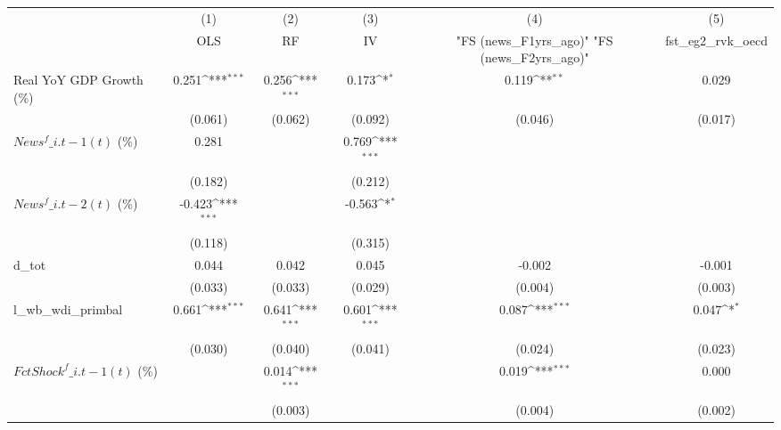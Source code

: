 {
\def\sym#1{\ifmmode^{#1}\else\(^{#1}\)\fi}
\begin{tabular}{l*{5}{c}}
\toprule
                    &\multicolumn{1}{c}{(1)}&\multicolumn{1}{c}{(2)}&\multicolumn{1}{c}{(3)}&\multicolumn{1}{c}{(4)}&\multicolumn{1}{c}{(5)}\\
                    &\multicolumn{1}{c}{OLS}&\multicolumn{1}{c}{RF}&\multicolumn{1}{c}{IV}&\multicolumn{1}{c}{ "FS (news\_F1yrs\_ago)"  "FS (news\_F2yrs\_ago)" }&\multicolumn{1}{c}{fst\_eg2\_rvk\_oecd}\\
\midrule
Real YoY GDP Growth (\%)&       0.251\sym{***}&       0.256\sym{***}&       0.173\sym{*}  &       0.119\sym{**} &       0.029         \\
                    &     (0.061)         &     (0.062)         &     (0.092)         &     (0.046)         &     (0.017)         \\
\addlinespace
$ News^f\_{i.t-1}(t)$ (\%)&       0.281         &                     &       0.769\sym{***}&                     &                     \\
                    &     (0.182)         &                     &     (0.212)         &                     &                     \\
\addlinespace
$ News^f\_{i.t-2}(t)$ (\%)&      -0.423\sym{***}&                     &      -0.563\sym{*}  &                     &                     \\
                    &     (0.118)         &                     &     (0.315)         &                     &                     \\
\addlinespace
d\_tot               &       0.044         &       0.042         &       0.045         &      -0.002         &      -0.001         \\
                    &     (0.033)         &     (0.033)         &     (0.029)         &     (0.004)         &     (0.003)         \\
\addlinespace
l\_wb\_wdi\_primbal    &       0.661\sym{***}&       0.641\sym{***}&       0.601\sym{***}&       0.087\sym{***}&       0.047\sym{*}  \\
                    &     (0.030)         &     (0.040)         &     (0.041)         &     (0.024)         &     (0.023)         \\
\addlinespace
$ FctShock^f\_{i.t-1}(t)$ (\%)&                     &       0.014\sym{***}&                     &       0.019\sym{***}&       0.000         \\
                    &                     &     (0.003)         &                     &     (0.004)         &     (0.002)         \\

\end{tabular}}
